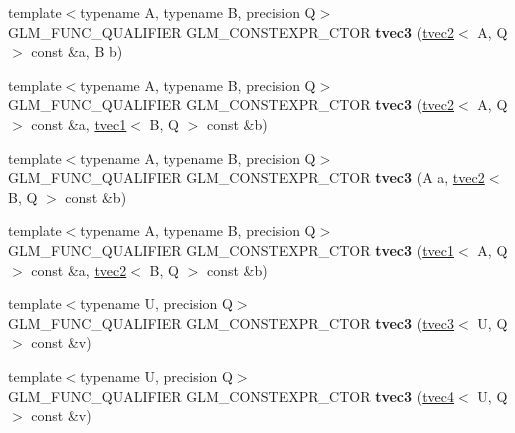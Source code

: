 \begin{DoxyCompactItemize}
{\footnotesize template$<$typename A, typename B, precision Q$>$ }\\G\+L\+M\+\_\+\+F\+U\+N\+C\+\_\+\+Q\+U\+A\+L\+I\+F\+I\+ER G\+L\+M\+\_\+\+C\+O\+N\+S\+T\+E\+X\+P\+R\+\_\+\+C\+T\+OR {\bfseries tvec3} (\hyperlink{structglm_1_1tvec2}{tvec2}$<$ A, Q $>$ const \&a, B b)
\item 
\mbox{\label{structglm_1_1tvec3_a8076ac0b4ff4fcc44a88d9ff282c65fd}} 
{\footnotesize template$<$typename A, typename B, precision Q$>$ }\\G\+L\+M\+\_\+\+F\+U\+N\+C\+\_\+\+Q\+U\+A\+L\+I\+F\+I\+ER G\+L\+M\+\_\+\+C\+O\+N\+S\+T\+E\+X\+P\+R\+\_\+\+C\+T\+OR {\bfseries tvec3} (\hyperlink{structglm_1_1tvec2}{tvec2}$<$ A, Q $>$ const \&a, \hyperlink{structglm_1_1tvec1}{tvec1}$<$ B, Q $>$ const \&b)
\item 
\mbox{\label{structglm_1_1tvec3_af057ada5ce68dbd5954d9c4cde8898b3}} 
{\footnotesize template$<$typename A, typename B, precision Q$>$ }\\G\+L\+M\+\_\+\+F\+U\+N\+C\+\_\+\+Q\+U\+A\+L\+I\+F\+I\+ER G\+L\+M\+\_\+\+C\+O\+N\+S\+T\+E\+X\+P\+R\+\_\+\+C\+T\+OR {\bfseries tvec3} (A a, \hyperlink{structglm_1_1tvec2}{tvec2}$<$ B, Q $>$ const \&b)
\item 
\mbox{\label{structglm_1_1tvec3_a64c26f79c83220322f8bdcab744dc033}} 
{\footnotesize template$<$typename A, typename B, precision Q$>$ }\\G\+L\+M\+\_\+\+F\+U\+N\+C\+\_\+\+Q\+U\+A\+L\+I\+F\+I\+ER G\+L\+M\+\_\+\+C\+O\+N\+S\+T\+E\+X\+P\+R\+\_\+\+C\+T\+OR {\bfseries tvec3} (\hyperlink{structglm_1_1tvec1}{tvec1}$<$ A, Q $>$ const \&a, \hyperlink{structglm_1_1tvec2}{tvec2}$<$ B, Q $>$ const \&b)
\item 
\mbox{\label{structglm_1_1tvec3_a1366e758df5526833c39e492b07a026c}} 
{\footnotesize template$<$typename U, precision Q$>$ }\\G\+L\+M\+\_\+\+F\+U\+N\+C\+\_\+\+Q\+U\+A\+L\+I\+F\+I\+ER G\+L\+M\+\_\+\+C\+O\+N\+S\+T\+E\+X\+P\+R\+\_\+\+C\+T\+OR {\bfseries tvec3} (\hyperlink{structglm_1_1tvec3}{tvec3}$<$ U, Q $>$ const \&v)
\item 
\mbox{\label{structglm_1_1tvec3_a2c796e51503a52b4ad1d3c1efd9e9a8e}} 
{\footnotesize template$<$typename U, precision Q$>$ }\\G\+L\+M\+\_\+\+F\+U\+N\+C\+\_\+\+Q\+U\+A\+L\+I\+F\+I\+ER G\+L\+M\+\_\+\+C\+O\+N\+S\+T\+E\+X\+P\+R\+\_\+\+C\+T\+OR {\bfseries tvec3} (\hyperlink{structglm_1_1tvec4}{tvec4}$<$ U, Q $>$ const \&v)

\end{DoxyCompactItemize}
